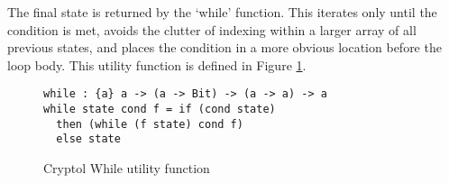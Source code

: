 The final state is returned by the ‘while’ function. This iterates only until the 
condition is met, avoids the clutter of indexing within a larger array of all previous 
states, and places the condition in a more obvious location before the loop body. This 
utility function is defined in Figure \ref{fig:cryptolWhile}.

\begin{figure}[h]
  \centering
\begin{lstlisting}[language=Cryptol]
while : {a} a -> (a -> Bit) -> (a -> a) -> a
while state cond f = if (cond state)
  then (while (f state) cond f)	
  else state
\end{lstlisting}
\caption{Cryptol While utility function}
\label{fig:cryptolWhile}
\end{figure}